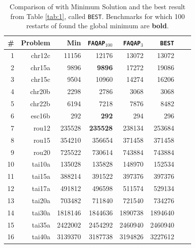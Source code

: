 \documentclass[10pt,journal,cspaper,compsoc]{IEEEtran}
\begin{document}
% 


\begin{table}[h!]
\caption{Comparison of \faqap with Minimum Solution and the best result from Table \ref{tab:1}, called \texttt{BEST}.  Benchmarks for which 100 restarts of \faqap found the global minimum are \textbf{bold}.}
\begin{center}
\begin{tabular}{|r|r|r||r|r|r|r|r|}
\hline
\# & Problem  &   Min    & \texttt{FAQAP}$_{100}$ & \texttt{FAQAP}$_{3}$ & \texttt{BEST} \\
\hline
1&    chr12c &   11156 &   12176 &   13072 &     13072 \\
2&    chr15a &    9896 &    \textbf{9896} &   17272 &      19086 \\
3&    chr15c &    9504 &   10960 &   14274 &      16206 \\
4&   chr20b &    2298 &    2786 &    3068 &        3068 \\
5&    chr22b &    6194 &    7218 &    7876 &       8482 \\
6&    esc16b &     292 &     \textbf{292} &     294 &        296 \\
7&     rou12 &  235528 &  \textbf{235528} &  238134 &    253684 \\
8&     rou15 &  354210 &  356654 &  371458 &    371458 \\
9&     rou20 &  725522 &  730614 &  743884 &    743884 \\
10&    tai10a &  135028 &  135828 &  148970 &    152534 \\
11&    tai15a &  388214 &  391522 &  397376 &    397376 \\
12&    tai17a &  491812 &  496598 &  511574 &    529134 \\
13&    tai20a &  703482 &  711840 &  721540 &    734276 \\
14&    tai30a & 1818146 & 1844636 & 1890738 &  1894640 \\
15&    tai35a & 2422002 & 2454292 & 2460940 &  2460940 \\
16&    tai40a & 3139370 & 3187738 & 3194826 &  3227612 \\
    \hline
\end{tabular}
\end{center}
\label{tab:2}
\end{table}%
\end{document}
